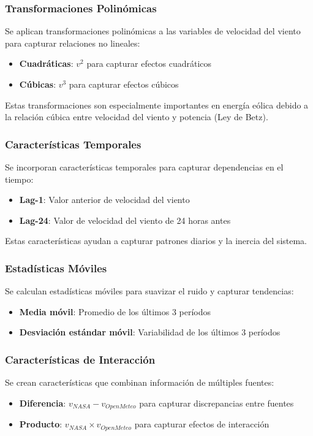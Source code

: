\documentclass[conference]{IEEEtran}
\begin{document}
	\subsubsection{Transformaciones Polinómicas}
	Se aplican transformaciones polinómicas a las variables de velocidad del viento para capturar relaciones no lineales:
	\begin{itemize}
		\item \textbf{Cuadráticas}: $v^2$ para capturar efectos cuadráticos
		\item \textbf{Cúbicas}: $v^3$ para capturar efectos cúbicos
	\end{itemize}
	
	Estas transformaciones son especialmente importantes en energía eólica debido a la relación cúbica entre velocidad del viento y potencia (Ley de Betz).
	
	\subsubsection{Características Temporales}
	Se incorporan características temporales para capturar dependencias en el tiempo:
	\begin{itemize}
		\item \textbf{Lag-1}: Valor anterior de velocidad del viento
		\item \textbf{Lag-24}: Valor de velocidad del viento de 24 horas antes
	\end{itemize}
	
	Estas características ayudan a capturar patrones diarios y la inercia del sistema.
	
	\subsubsection{Estadísticas Móviles}
	Se calculan estadísticas móviles para suavizar el ruido y capturar tendencias:
	\begin{itemize}
		\item \textbf{Media móvil}: Promedio de los últimos 3 períodos
		\item \textbf{Desviación estándar móvil}: Variabilidad de los últimos 3 períodos
	\end{itemize}
	
	\subsubsection{Características de Interacción}
	Se crean características que combinan información de múltiples fuentes:
	\begin{itemize}
		\item \textbf{Diferencia}: $v_{NASA} - v_{OpenMeteo}$ para capturar discrepancias entre fuentes
		\item \textbf{Producto}: $v_{NASA} \times v_{OpenMeteo}$ para capturar efectos de interacción
	\end{itemize}
	
\end{document}
